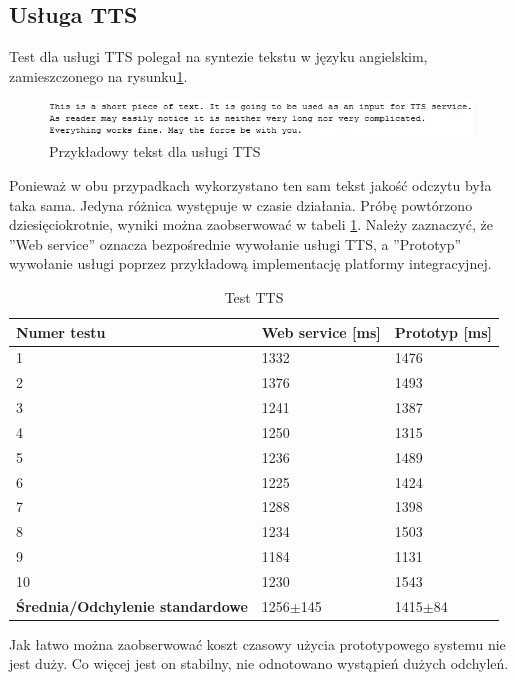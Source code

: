 \subsection{Usługa TTS}
Test dla usługi TTS polegał na syntezie tekstu  w języku angielskim, zamieszczonego na rysunku\ref{fig:ttsExample}.
\begin{figure}[!h]
\centering
\includegraphics[scale=0.9]{textExample.png}
\caption{Przykładowy tekst dla usługi TTS}\label{fig:ttsExample}
\end{figure}
Ponieważ w obu przypadkach wykorzystano ten sam tekst jakość odczytu była taka sama. Jedyna różnica występuje w czasie działania. Próbę powtórzono dziesięciokrotnie, wyniki można zaobserwować w tabeli \ref{tab:tts}. Należy zaznaczyć, że ''Web service'' oznacza bezpośrednie wywołanie usługi TTS, a ''Prototyp'' wywołanie usługi poprzez przykładową implementację platformy integracyjnej.
\begin{center}
	\begin{table}[h]
	\caption{Test TTS}
	\label{tab:tts}
	\centering
	\begin{tabular}{| l | l | l |}	
		\hline
		\textbf{Numer testu} & \textbf{Web service [ms]} & \textbf{Prototyp [ms]} \\ \hline
		1 & 1332 & 1476\\ \hline
		2 & 1376 & 1493\\ \hline
		3 & 1241 & 1387\\ \hline
		4 & 1250 & 1315\\ \hline
		5 & 1236 & 1489\\ \hline
		6 & 1225 & 1424\\ \hline
		7 & 1288 & 1398\\ \hline
		8 & 1234 & 1503\\ \hline
		9 & 1184 & 1131\\ \hline
		10 & 1230 & 1543\\ \hline
		\textbf{Średnia/Odchylenie standardowe} & 1256$\pm$145 & 1415$\pm$84\\ 
		\hline
	\end{tabular}
	\end{table}
\end{center}
\newpage
Jak łatwo można zaobserwować koszt czasowy użycia prototypowego systemu nie jest duży. Co więcej jest on stabilny, nie odnotowano wystąpień dużych odchyleń.

